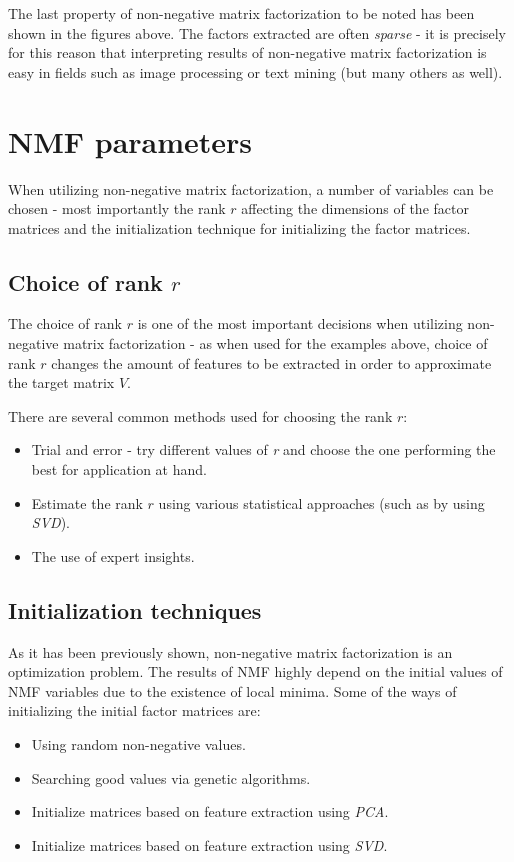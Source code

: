 \documentclass[thesis=M,english]{FITthesis}[2012/10/20]
\begin{document}
The last property of non-negative matrix factorization to be noted has been
shown in the figures above. The factors extracted are often \emph{sparse} - it is
precisely for this reason that interpreting results of non-negative matrix
factorization is easy in fields such as image processing or text mining (but many
others as well).\cite{nmf-whyhow}

\section{NMF parameters}
When utilizing non-negative matrix factorization, a number of variables can
be chosen - most importantly the rank $r$ affecting the dimensions of the
factor matrices and the initialization technique for initializing the
factor matrices.

\subsection{Choice of rank $r$}
The choice of rank $r$ is one of the most important decisions when utilizing non-negative
matrix factorization - as when used for the examples above, choice of rank $r$
changes the amount of features to be extracted in order to approximate the target
matrix $V$.

There are several common methods used for choosing the rank $r$:
\begin{itemize}
  \item Trial and error - try different values of \emph{r} and choose the one
        performing the best for application at hand.
  \item Estimate the rank $r$ using various statistical approaches (such as by
        using \emph{SVD}).
  \item The use of expert insights.
\end{itemize}\cite{nmf-whyhow}


\subsection{Initialization techniques}
As it has been previously shown, non-negative matrix factorization is an optimization
problem. The results of NMF highly depend on the initial values of NMF variables due to
the existence of local minima. Some of the ways of initializing the initial factor
matrices are:
\begin{itemize}
  \item Using random non-negative values.
  \item Searching good values via genetic algorithms.
  \item Initialize matrices based on feature extraction using \emph{PCA}.
  \item Initialize matrices based on feature extraction using \emph{SVD}.
\end{itemize}\cite{nmfinit}
\end{document}
